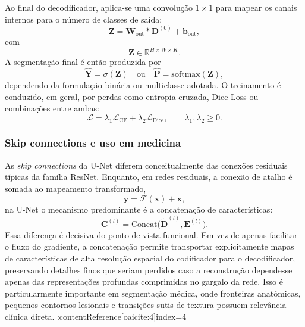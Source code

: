 \documentclass[tcc,capa]{texufpel}
\begin{document}
Ao final do decodificador, aplica-se uma convolução \(1\times1\) para mapear os canais internos para o número de classes de saída:
\begin{equation}
	\mathbf{Z} = \mathbf{W}_{\text{out}} * \mathbf{D}^{(0)} + \mathbf{b}_{\text{out}},
\end{equation}
com
\begin{equation}
	\mathbf{Z} \in \mathbb{R}^{H \times W \times K}.
\end{equation}
A segmentação final é então produzida por
\begin{equation}
	\hat{\mathbf{Y}} = \sigma(\mathbf{Z})
	\quad \text{ou} \quad
	\hat{\mathbf{P}} = \mathrm{softmax}(\mathbf{Z}),
\end{equation}
dependendo da formulação binária ou multiclasse adotada. O treinamento é conduzido, em geral, por perdas como entropia cruzada, Dice Loss ou combinações entre ambas:
\begin{equation}
	\mathcal{L} = \lambda_1 \mathcal{L}_{\text{CE}} + \lambda_2 \mathcal{L}_{\text{Dice}},
	\qquad
	\lambda_1,\lambda_2 \ge 0.
\end{equation}

\subsubsection{Skip connections e uso em medicina}

As \textit{skip connections} da U-Net diferem conceitualmente das conexões residuais típicas da família ResNet. Enquanto, em redes residuais, a conexão de atalho é somada ao mapeamento transformado,
\begin{equation}
	\mathbf{y} = \mathcal{F}(\mathbf{x}) + \mathbf{x},
\end{equation}
na U-Net o mecanismo predominante é a concatenação de características:
\begin{equation}
	\mathbf{C}^{(l)} = \mathrm{Concat}\big(\tilde{\mathbf{D}}^{(l)}, \mathbf{E}^{(l)}\big).
\end{equation}
Essa diferença é decisiva do ponto de vista funcional. Em vez de apenas facilitar o fluxo do gradiente, a concatenação permite transportar explicitamente mapas de características de alta resolução espacial do codificador para o decodificador, preservando detalhes finos que seriam perdidos caso a reconstrução dependesse apenas das representações profundas comprimidas no gargalo da rede. Isso é particularmente importante em segmentação médica, onde fronteiras anatômicas, pequenos contornos lesionais e transições sutis de textura possuem relevância clínica direta. :contentReference[oaicite:4]{index=4}
\end{document}
